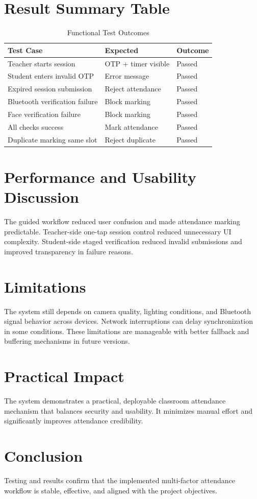 \section{Result Summary Table}
\begin{table}[H]
\centering
\caption{Functional Test Outcomes}
\label{c6:tab1}
\begin{tabular}{|L{4.4cm}|L{2.4cm}|L{3.8cm}|}
\hline
\textbf{Test Case} & \textbf{Expected} & \textbf{Outcome}\\
\hline
Teacher starts session & OTP + timer visible & Passed\\
\hline
Student enters invalid OTP & Error message & Passed\\
\hline
Expired session submission & Reject attendance & Passed\\
\hline
Bluetooth verification failure & Block marking & Passed\\
\hline
Face verification failure & Block marking & Passed\\
\hline
All checks success & Mark attendance & Passed\\
\hline
Duplicate marking same slot & Reject duplicate & Passed\\
\hline
\end{tabular}
\end{table}

\section{Performance and Usability Discussion}
The guided workflow reduced user confusion and made attendance marking predictable. Teacher-side one-tap session control reduced unnecessary UI complexity. Student-side staged verification reduced invalid submissions and improved transparency in failure reasons.

\section{Limitations}
The system still depends on camera quality, lighting conditions, and Bluetooth signal behavior across devices. Network interruptions can delay synchronization in some conditions. These limitations are manageable with better fallback and buffering mechanisms in future versions.

\section{Practical Impact}
The system demonstrates a practical, deployable classroom attendance mechanism that balances security and usability. It minimizes manual effort and significantly improves attendance credibility.

\section{Conclusion}
Testing and results confirm that the implemented multi-factor attendance workflow is stable, effective, and aligned with the project objectives.

